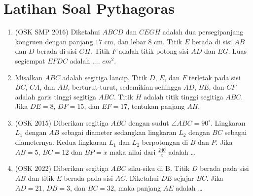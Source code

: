 \documentclass[12pt]{scrartcl}
\begin{document}
\section{Latihan Soal Pythagoras}
\begin{enumerate}
    \item (OSK SMP 2016) Diketahui $ABCD$ dan $CEGH$ adalah dua persegipanjang kongruen dengan panjang $17$ cm, dan lebar $8$ cm. Titik $E$ berada di sisi $AB$ dan $D$ berada di sisi $GH$. Titik $F$ adalah titik potong sisi $AD$ dan $EG$. Luas segiempat $EFDC$ adalah .... $cm^2$.

    \item Misalkan $ABC$ adalah segitiga lancip. Titik $D$, $E$, dan $F$ terletak pada sisi $BC$, $CA$, dan $AB$, berturut-turut, sedemikian sehingga $AD$, $BE$, dan $CF$ adalah garis tinggi segitiga $ABC$. Titik $H$ adalah titik tinggi segitiga $ABC$. Jika $DE = 8$, $DF = 15$, dan $EF = 17$, tentukan panjang $AH$.

    \item (OSK 2015) Diberikan segitiga $ABC$ dengan sudut $\angle ABC = 90^\circ$. Lingkaran $L_1$ dengan $AB$ sebagai diameter sedangkan lingkaran $L_2$ dengan $BC$ sebagai diameternya. Kedua lingkaran $L_1$ dan $L_2$ berpotongan di $B$ dan $P$. Jika $AB = 5$, $BC = 12$ dan $BP = x$ maka nilai dari $\frac{240}{x}$ adalah \ldots

    \item (OSK 2022) Diberikan segitiga $ABC$ siku-siku di B. Titik $D$ berada pada sisi $AB$ dan titik $E$ berada pada sisi $AC$. Diketahui $DE$ sejajar $BC$. Jika $AD = 21$, $DB = 3$, dan $BC = 32$, maka panjang $AE$ adalah \dots

\end{enumerate}
\end{document}
